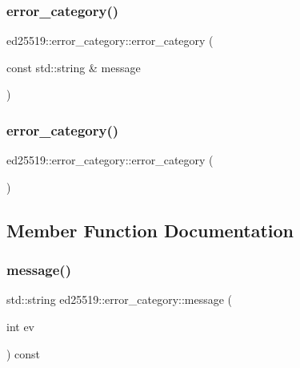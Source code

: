 \subsubsection{\texorpdfstring{error\_category()}{error\_category()}\hspace{0.1cm}{\footnotesize\ttfamily [1/2]}}
{\footnotesize\ttfamily ed25519\+::error\+\_\+category\+::error\+\_\+category (\begin{DoxyParamCaption}\item[{const std\+::string \&}]{message }\end{DoxyParamCaption})}

\mbox{\label{classed25519_1_1error__category_a4fe3061ad89abff2d326dacbae9cee7d}} 
\subsubsection{\texorpdfstring{error\_category()}{error\_category()}\hspace{0.1cm}{\footnotesize\ttfamily [2/2]}}
{\footnotesize\ttfamily ed25519\+::error\+\_\+category\+::error\+\_\+category (\begin{DoxyParamCaption}{ }\end{DoxyParamCaption})\hspace{0.3cm}{\ttfamily [inline]}}



\subsection{Member Function Documentation}
\mbox{\label{classed25519_1_1error__category_a202bf6ba84147b563f630c8f52c723ef}} 
\subsubsection{\texorpdfstring{message()}{message()}}
{\footnotesize\ttfamily std\+::string ed25519\+::error\+\_\+category\+::message (\begin{DoxyParamCaption}\item[{int}]{ev }\end{DoxyParamCaption}) const\hspace{0.3cm}{\ttfamily [override]}}

